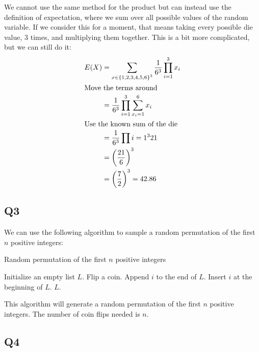 We cannot use the same method for the product but can instead use the definition of expectation, where we sum over all possible values of the random variable. If we consider this for a moment, that means taking every possible die value, 3 times, and multiplying them together. This is a bit more complicated, but we can still do it:
\begin{align*}
    E(X) &= \sum_{x\in \left\{1,2,3,4,5,6\right\}^3} \frac{1}{6^3} \prod_{i=1}^3 x_i \\
    \intertext{Move the terms around}
    &= \frac{1}{6^3} \prod_{i=1}^3\sum_{x_i=1}^6  x_i \\
    \intertext{Use the known sum of the die}
    &= \frac{1}{6^3} \prod{i=1}^3 21 \\
    &= \left(\frac{21}{6}\right)^3 \\
    &= \left(\frac{7}{2}\right)^3 = 42.86
\end{align*}

\subsection{Q3}

We can use the following algorithm to sample a random permutation of the first $n$ positive integers:
\begin{algorithm}[H]
  \caption{Random permutation of the first $n$ positive integers}
  \begin{algorithmic}[1]
    \State Initialize an empty list $L$.
      \State Flip a coin.
        \State Append $i$ to the end of $L$.
      \Else
        \State Insert $i$ at the beginning of $L$.
      \EndIf
    \EndFor
    \State \Return $L$.
  \end{algorithmic}
\end{algorithm}

This algorithm will generate a random permutation of the first $n$ positive integers. The number of coin flips needed is $n$.

\subsection{Q4}

